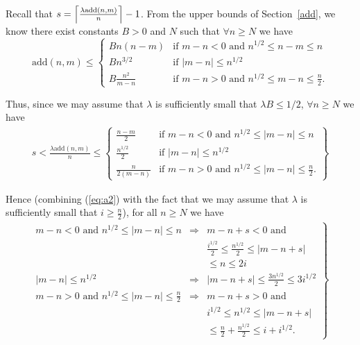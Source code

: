 \documentclass{article}
\newtheorem{Proof of Theorem}{Proof of Theorem}
\begin{document}
Recall that $s=\left \lceil \frac{\lambda \textrm{\scriptsize{add}}(n,m)}{n} \right \rceil - 1$.
From the upper bounds of Section~\ref{add}, 
we know there exist constants $B>0$ and $N$ such that $\forall n \geq N$ we have
\begin{displaymath}
\textrm{add}(n,m) \leq
\left\{ \begin{array}{ll}
Bn(n-m) & \textrm{if $m-n<0$ and $n^{1/2} \leq n-m \leq n$} \\
Bn^{3/2} & \textrm{if $|m-n| \leq n^{1/2}$} \\
B \frac{n^{2}}{m-n} & \textrm{if $m-n>0$ and $n^{1/2} \leq m-n \leq \frac{n}{2}$}. 
\end{array} \right. 
\end{displaymath} 

Thus, since we may assume that $\lambda$ is sufficiently small that $\lambda B \leq 1/2$, 
$\forall n \geq N$ we have 
\begin{eqnarray}
s < \frac{\lambda \textrm{add}(n,m) }{n} \leq
\left\{ \begin{array}{ll}
\frac{n-m}{2} & \textrm{if $m-n<0$ and $n^{1/2} \leq |m-n| \leq n$} \\
\frac{n^{1/2}}{2} & \textrm{if $|m-n| \leq n^{1/2}$} \\
\frac{n}{2(m-n)} & \textrm{if $m-n>0$ and $n^{1/2} \leq |m-n| \leq \frac{n}{2}$}. \label{eq:a2}
\end{array} \right\} 
\end{eqnarray} 

Hence
(combining (\ref{eq:a2}) with the fact that we may assume that $\lambda$ is sufficiently small that $i \geq \frac{n}{2}$),
for all $n \geq N$ we have 
\begin{eqnarray}
\left. \begin{array}{lll}
m-n<0 \textrm{ and } n^{1/2} \leq |m-n| \leq n 
& \Rightarrow &
m-n+s < 0 \textrm{ and } \\
& & \frac{i^{1/2}}{2} \leq \frac{n^{1/2}}{2} \leq |m-n+s| \\
& & \leq n \leq 2i \\
|m-n| \leq n^{1/2} 
& \Rightarrow &
|m-n+s| \leq \frac{3n^{1/2}}{2} \leq 3i^{1/2} \\
m-n>0 \textrm{ and } n^{1/2} \leq |m-n| \leq \frac{n}{2} 
& \Rightarrow &
m-n+s>0 \textrm{ and } \\
& & i^{1/2} \leq n^{1/2} \leq |m-n+s| \\
& & \leq \frac{n}{2} + \frac{n^{1/2}}{2} \leq i + i^{1/2}. \label{eq:a3}
\end{array} \right \}
\end{eqnarray} 
\phantom{p}
\end{document}
